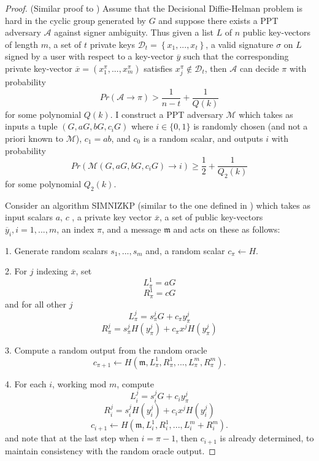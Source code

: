 \documentclass[12pt,english]{mrl}
\theoremstyle{definition}
\numberwithin{equation}{section}
\numberwithin{figure}{section}
\numberwithin{equation}{section}
\numberwithin{equation}{section}
\numberwithin{figure}{section}
\begin{document}
\begin{proof}
(Similar proof to \cite[Theorem 2]{LWW}) Assume that the Decisional Diffie-Helman problem is hard in the cyclic group generated by $G$ and suppose there exists a PPT
adversary $\mathcal{A}$ against signer ambiguity. Thus given a list
$L$ of $n$ public key-vectors of length $m$, a set of $t$ private
keys $\mathcal{D}_{t}=\left\{ x_{1},...,x_{t}\right\} $, a valid
signature $\sigma$ on $L$ signed by a user with respect to a key-vector
$\overline{y}$ such that the corresponding private key-vector $\overline{x}=\left(x_{1}^{\pi},...,x_{m}^{\pi}\right)$
satisfies $x_{j}^{\pi}\notin\mathcal{D}_{t}$, then $\mathcal{A}$
can decide $\pi$ with probability 
\[
Pr\left(\mathcal{A}\to\pi\right)>\frac{1}{n-t}+\frac{1}{Q\left(k\right)}
\]
 for some polynomial $Q\left(k\right)$. I construct a PPT adversary
$\mathcal{M}$ which takes as inputs a tuple 
$\left(G,aG,bG,c_{i}G\right)$ where $i\in \{0,1\}$ is randomly chosen (and not a priori known to $\mathcal{M}$), $c_{1}=ab$, and $c_{0}$ is a random scalar, and outputs $i$ with probability
\[
Pr\left(\mathcal{M}\left(G, aG,bG,c_{i}G\right)\to i\right)\ge\frac{1}{2}+\frac{1}{Q_{2}\left(k\right)}
\]
 for some polynomial $Q_{2}\left(k\right)$. 

Consider an algorithm SIMNIZKP (similar to the one defined in \cite{FS}) which takes
as input scalars $a$, $c$ , a private key vector $\overline{x}$,
a set of public key-vectors $\overline{y}_{i},i=1,...,m$, an index
$\pi$, and a message $\mathfrak{m}$ and acts on these as follows: 

1. Generate random scalars $s_{1},...,s_{m}$ and, a random scalar
$c_{\pi}\leftarrow H$. 

2. For $j$ indexing $\overline{x}$, set
\[
L_{\pi}^{1}=aG
\]
\[
R_{\pi}^{1}=cG
\]
 and for all other $j$ 
\[
L_{\pi}^{j}=s_{\pi}^{j}G+c_{\pi}y_{\pi}^{j}
\]
\[
R_{\pi}^{j}=s_{\pi}^{j}H\left(y_{\pi}^{j}\right)+c_{\pi}x^{j}H\left(y_{\pi}^{j}\right)
\]

3. Compute a random output from the random oracle 
\[
c_{\pi+1}\leftarrow H\left(\mathfrak{m},L_{\pi}^{1},R_{\pi}^{1},...,L_{\pi}^{m},R_{\pi}^{m}\right).
\]

4. For each $i$, working mod $m$, compute 
\[
L_{i}^{j}=s_{i}^{j}G+c_{i}y_{\pi}^{j}
\]
\[
R_{i}^{j}=s_{i}^{j}H\left(y_{i}^{j}\right)+c_{i}x^{j}H\left(y_{i}^{j}\right)
\]
\[
c_{i+1}\leftarrow H\left(\mathfrak{m},L_{i}^{1},R_{i}^{1},...,L_{i}^{m}+R_{i}^{m}\right).
\]
 and note that at the last step when $i=\pi-1$, then $c_{i+1}$
is already determined, to maintain consistency with the random oracle
output. 


\end{proof}
\end{document}
